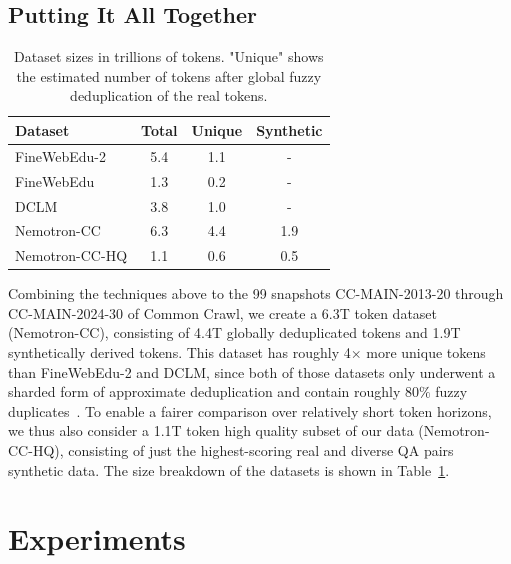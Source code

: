 \documentclass[11pt]{article}
\newcommand{\DCLM}{\textsc{DCLM}\xspace}
\newcommand{\Ours}{Nemotron-CC\xspace}
\begin{document}
\subsection{Putting It All Together}

\begin{table}[hbt]\small\centering
\begin{tabularx}{\linewidth}{Xccc}
\toprule
\textbf{Dataset} & \textbf{Total} & \textbf{Unique} & \textbf{Synthetic} \\ \midrule
FineWebEdu-2  & 5.4  & 1.1   & -         \\
FineWebEdu    & 1.3  & 0.2   & -         \\
\DCLM & 3.8  & 1.0     & -         \\
\Ours          & 6.3  & 4.4   & 1.9      \\
\Ours-HQ       & 1.1  & 0.6   & 0.5      \\ \bottomrule
\end{tabularx}
\caption{Dataset sizes in trillions of tokens. "Unique" shows the estimated number of tokens after global fuzzy deduplication of the real tokens.}
\label{table:dataset_sizes}
\end{table}

Combining the techniques above to the 99 snapshots CC-MAIN-2013-20 through CC-MAIN-2024-30 of Common Crawl, we create a 6.3T token dataset (\Ours), consisting of 4.4T globally deduplicated tokens and 1.9T synthetically derived tokens. This dataset has roughly 4$\times$ more unique tokens than FineWebEdu-2 and \DCLM, since both of those datasets only underwent a sharded form of approximate deduplication and contain roughly $80\%$ fuzzy duplicates~\citep{fineweb-edu-discussion,li2024datacomp}. To enable a fairer comparison over relatively short token horizons, we thus also consider a 1.1T token high quality subset of our data (\Ours-HQ), consisting of just the highest-scoring real and diverse QA pairs synthetic data. The size breakdown of the datasets is shown in Table~\ref{table:dataset_sizes}.

\section{Experiments}
\end{document}
